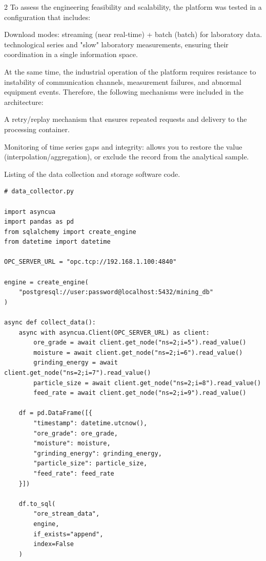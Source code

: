 \begin{multicols}{2}
To assess the engineering feasibility and scalability, the platform was
tested in a configuration that includes:

Download modes: streaming (near real-time) + batch (batch) for
laboratory data. technological series and "slow" laboratory
measurements, ensuring their coordination in a single information space.

At the same time, the industrial operation of the platform requires
resistance to instability of communication channels, measurement
failures, and abnormal equipment events. Therefore, the following
mechanisms were included in the architecture:

A retry/replay mechanism that ensures repeated requests and delivery to
the processing container.

Monitoring of time series gaps and integrity: allows you to restore the
value (interpolation/aggregation), or exclude the record from the
analytical sample.

Listing of the data collection and storage software code.
\end{multicols}

{\small
\begin{verbatim}
# data_collector.py

import asyncua
import pandas as pd
from sqlalchemy import create_engine
from datetime import datetime

OPC_SERVER_URL = "opc.tcp://192.168.1.100:4840"

engine = create_engine(
    "postgresql://user:password@localhost:5432/mining_db"
)

async def collect_data():
    async with asyncua.Client(OPC_SERVER_URL) as client:
        ore_grade = await client.get_node("ns=2;i=5").read_value()
        moisture = await client.get_node("ns=2;i=6").read_value()
        grinding_energy = await client.get_node("ns=2;i=7").read_value()
        particle_size = await client.get_node("ns=2;i=8").read_value()
        feed_rate = await client.get_node("ns=2;i=9").read_value()

    df = pd.DataFrame([{
        "timestamp": datetime.utcnow(),
        "ore_grade": ore_grade,
        "moisture": moisture,
        "grinding_energy": grinding_energy,
        "particle_size": particle_size,
        "feed_rate": feed_rate
    }])

    df.to_sql(
        "ore_stream_data",
        engine,
        if_exists="append",
        index=False
    )
\end{verbatim}
}

